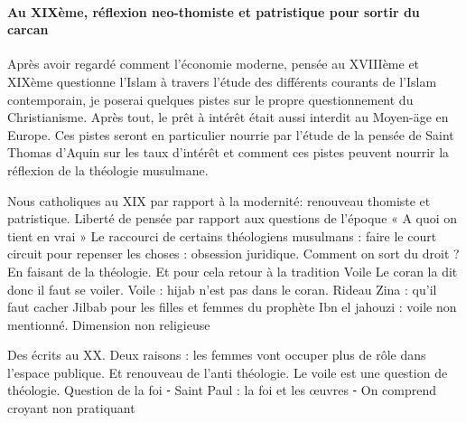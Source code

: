\paragraph{Au XIXème, réflexion neo-thomiste et patristique pour sortir du carcan}
Après avoir regardé comment l'économie moderne, pensée au XVIIIème et XIXème questionne l'Islam à travers l'étude des différents courants de l'Islam contemporain, je poserai quelques pistes sur le propre questionnement du Christianisme. Après tout, le prêt à intérêt était aussi interdit au Moyen-äge en Europe. Ces pistes seront en particulier nourrie par l'étude de la pensée de Saint Thomas d'Aquin sur les taux d'intérêt et comment ces pistes peuvent nourrir la réflexion de la théologie musulmane. 

Nous catholiques au XIX par rapport à la modernité: renouveau thomiste et patristique. Liberté de pensée par rapport aux questions de l’époque
« A quoi on tient en vrai »
Le raccourci de certains théologiens musulmans : faire le court circuit pour repenser les choses : obsession juridique. Comment on sort du droit ? En faisant de la théologie. Et pour cela retour à la tradition
Voile
Le coran la dit donc il faut se voiler. Voile : hijab n’est pas dans le coran. Rideau
Zina : qu’il faut cacher
Jilbab pour les filles et femmes du prophète 
Ibn el jahouzi : voile non mentionné. Dimension non religieuse

Des écrits au XX. Deux raisons : les femmes vont occuper plus de rôle dans l’espace publique.
Et renouveau de l’anti théologie. Le voile est une question de théologie. Question de la foi
	⁃	Saint Paul : la foi et les œuvres
	⁃	On comprend croyant non pratiquant
	